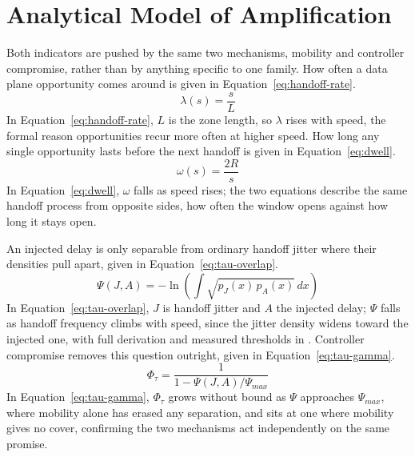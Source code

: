 \documentclass[lettersize,journal]{IEEEtran}
\begin{document}
\section{Analytical Model of Amplification}
\label{sec:analysis}
Both indicators are pushed by the same two mechanisms, mobility and controller compromise, rather than by anything specific to one family. How often a data plane opportunity comes around is given in Equation~\eqref{eq:handoff-rate}.
\begin{equation}
\lambda(s) = \frac{s}{L}
\label{eq:handoff-rate}
\end{equation}
In Equation~\eqref{eq:handoff-rate}, $L$ is the zone length, so $\lambda$ rises with speed, the formal reason opportunities recur more often at higher speed. How long any single opportunity lasts before the next handoff is given in Equation~\eqref{eq:dwell}.
\begin{equation}
\omega(s) = \frac{2R}{s}
\label{eq:dwell}
\end{equation}
In Equation~\eqref{eq:dwell}, $\omega$ falls as speed rises; the two equations describe the same handoff process from opposite sides, how often the window opens against how long it stays open.

An injected delay is only separable from ordinary handoff jitter where their densities pull apart, given in Equation~\eqref{eq:tau-overlap}.
\begin{equation}
\Psi(J,A) = -\ln\!\left(\int \sqrt{p_J(x)\,p_A(x)}\,dx\right)
\label{eq:tau-overlap}
\end{equation}
In Equation~\eqref{eq:tau-overlap}, $J$ is handoff jitter and $A$ the injected delay; $\Psi$ falls as handoff frequency climbs with speed, since the jitter density widens toward the injected one, with full derivation and measured thresholds in \cite{phantom2026}. Controller compromise removes this question outright, given in Equation~\eqref{eq:tau-gamma}.
\begin{equation}
\Phi_\tau = \frac{1}{1 - \Psi(J,A)/\Psi_{max}}
\label{eq:tau-gamma}
\end{equation}
In Equation~\eqref{eq:tau-gamma}, $\Phi_\tau$ grows without bound as $\Psi$ approaches $\Psi_{max}$, where mobility alone has erased any separation, and sits at one where mobility gives no cover, confirming the two mechanisms act independently on the same promise.
\end{document}
